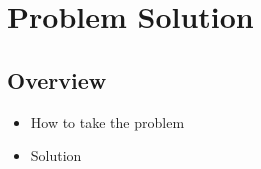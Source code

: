 
\chapter{Problem Solution}


\section{Overview}
\begin{itemize}
\item How to take the problem
\item Solution\end{itemize}

